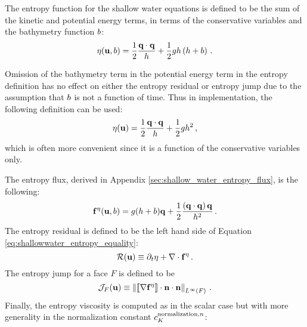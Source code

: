 The entropy function for the shallow water equations is defined to be
the sum of the kinetic and potential energy terms, in terms of the
conservative variables and the bathymetry function $b$:
\begin{equation}
  \eta(\mathbf{u},b)
  = \frac{1}{2}\frac{\mathbf{q}\cdot\mathbf{q}}
  {h} + \frac{1}{2}gh\left(h+b\right)
  \,.
\end{equation}
\begin{remark}
Omission of the bathymetry term in the potential energy
term in the entropy definition has no effect on either the entropy
residual or entropy jump due to the assumption that $b$ is
not a function of time. Thus in implementation, the following definition
can be used:
\begin{equation}
  \eta(\mathbf{u})
  = \frac{1}{2}\frac{\mathbf{q}\cdot\mathbf{q}}
  {h} + \frac{1}{2}gh^2
  \,,
\end{equation}
which is often more convenient since it is a function of the conservative
variables only.
\end{remark}
The entropy flux, derived in Appendix \ref{sec:shallow_water_entropy_flux}, is the
following:
\begin{equation}
  \mathbf{f}^\eta(\mathbf{u},b)
  = g(h + b)\mathbf{q}
  + \frac{1}{2}\frac{\left(\mathbf{q}\cdot\mathbf{q}\right)\mathbf{q}} 
  {h^2}
  \,.
\end{equation}
The entropy residual is defined to be the left hand side of 
Equation \eqref{eq:shallowwater_entropy_equality}:
\begin{equation}
  \mathcal{R}(\mathbf{u}) \equiv \partial_t\eta
  + \nabla\cdot\mathbf{f}^\eta
  \,.
\end{equation}
The entropy jump for a face $F$ is defined to be
\begin{equation}
  \mathcal{J}_F(\mathbf{u})
  \equiv \left\|
    \left\llbracket\nabla\mathbf{f}^\eta\right\rrbracket
    \cdot\mathbf{n}\cdot\mathbf{n}
  \right\|_{L^\infty(F)} \,.
\end{equation}
Finally, the entropy viscosity is computed as in the scalar case but with
more generality in the normalization constant $c^{\text{normalization},n}_K$:
